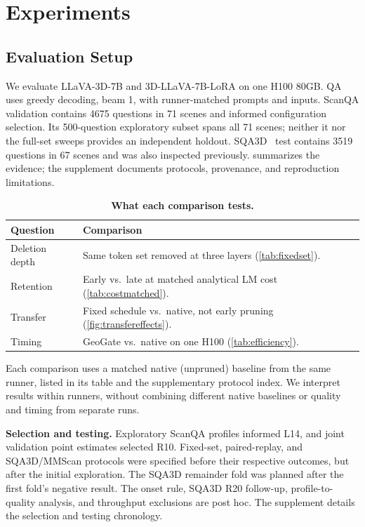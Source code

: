\section{Experiments}
\label{sec:experiments}
\subsection{Evaluation Setup}
We evaluate LLaVA-3D-7B and 3D-LLaVA-7B-LoRA on one H100 80GB. QA uses greedy decoding, beam 1, with runner-matched prompts and inputs. ScanQA validation contains 4675 questions in 71 scenes and informed configuration selection. Its 500-question exploratory subset spans all 71 scenes; neither it nor the full-set sweeps provides an independent holdout. SQA3D~\citep{ma2023sqa3d} test contains 3519 questions in 67 scenes and was also inspected previously.  summarizes the evidence; the supplement documents protocols, provenance, and reproduction limitations.

\begin{table}[t]
\centering
\small
\caption{\textbf{What each comparison tests.}}
\label{tab:evidence_map}
\setlength{\tabcolsep}{3pt}
\begin{tabular}{@{}p{}p{}@{}}
\toprule
Question & Comparison \\
\midrule
Deletion depth & Same token set removed at three layers (\cref{tab:fixedset}). \\
Retention & Early vs.\ late at matched analytical LM cost (\cref{tab:costmatched}). \\
Transfer & Fixed schedule vs.\ native, not early pruning (\cref{fig:transfereffects}). \\
Timing & GeoGate vs.\ native on one H100 (\cref{tab:efficiency}). \\
\bottomrule
\end{tabular}
\end{table}

Each comparison uses a matched native (unpruned) baseline from the same runner, listed in its table and the supplementary protocol index. We interpret results within runners, without combining different native baselines or quality and timing from separate runs.

\textbf{Selection and testing.} Exploratory ScanQA profiles informed L14, and joint validation point estimates selected R10. Fixed-set, paired-replay, and SQA3D/MMScan protocols were specified before their respective outcomes, but after the initial exploration. The SQA3D remainder fold was planned after the first fold's negative result. The onset rule, SQA3D R20 follow-up, profile-to-quality analysis, and throughput exclusions are post hoc. The supplement details the selection and testing chronology.

